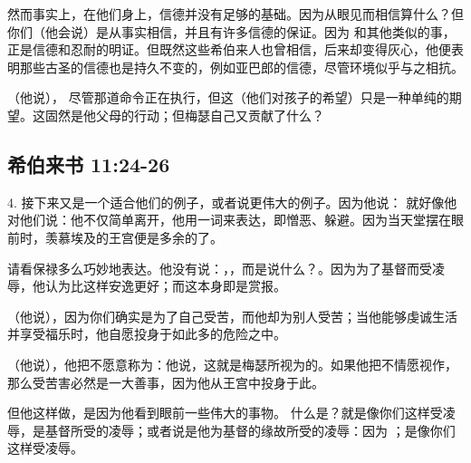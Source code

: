 然而事实上，在他们身上，信德并没有足够的基础。因为从眼见而相信算什么？但你们（他会说）是从事实相信，并且有许多信德的保证。因为  和其他类似的事，正是信德和忍耐的明证。但既然这些希伯来人也曾相信，后来却变得灰心，他便表明那些古圣的信德也是持久不变的，例如亚巴郎的信德，尽管环境似乎与之相抗。\par

（他说）， 尽管那道命令正在执行，但这（他们对孩子的希望）只是一种单纯的期望。这固然是他父母的行动；但梅瑟自己又贡献了什么？\par


\subsection{希伯来书 11:24-26}

4. 接下来又是一个适合他们的例子，或者说更伟大的例子。因为他说：  就好像他对他们说：他不仅简单离开，他用一词来表达，即憎恶、躲避。因为当天堂摆在眼前时，羡慕埃及的王宫便是多余的了。\par

请看保禄多么巧妙地表达。他没有说：，，而是说什么？。因为为了基督而受凌辱，他认为比这样安逸更好；而这本身即是赏报。\par

（他说），因为你们确实是为了自己受苦，而他却为别人受苦；当他能够虔诚生活并享受福乐时，他自愿投身于如此多的危险之中。\par

（他说），他把不愿意称为：他说，这就是梅瑟所视为的。如果他把不情愿视作，那么受苦害必然是一大善事，因为他从王宫中投身于此。\par

但他这样做，是因为他看到眼前一些伟大的事物。 什么是？就是像你们这样受凌辱，是基督所受的凌辱；或者说是他为基督的缘故所受的凌辱：因为 ；是像你们这样受凌辱。\par

